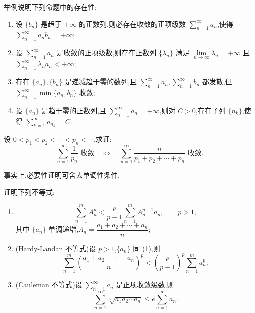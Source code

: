 \documentclass[../../数学分析培优讲义.tex]{subfiles}
\begin{document}
\begin{example}[\markstar]
举例说明下列命题中的存在性:
\begin{enumerate}[label=(\arabic*)]
    \item 设 $\{b_n\}$ 是趋于 $+\infty$ 的正数列,则必存在收敛的正项级数 $\displaystyle\sum\limits_{n=1}^{\infty}a_n$,使得 $\displaystyle\sum\limits_{n=1}^{\infty}a_nb_n=+\infty$;
    \item 设 $\displaystyle\sum\limits_{n=1}^{\infty}a_n$ 是收敛的正项级数,则存在正数列 $\{\lambda_n\}$ 满足 $\displaystyle\lim\limits_{n\to\infty}\lambda_n=+\infty$ 且 $\displaystyle\sum\limits_{n=1}^{\infty}\lambda_na_n<+\infty$;
    \item 存在 $\{a_n\},\{b_n\}$ 是递减趋于零的数列,且 $\displaystyle\sum\limits_{n=1}^{\infty}a_n,\sum\limits_{n=1}^{\infty}b_n$ 都发散,但 $\displaystyle\sum\limits_{n=1}^{\infty}\min\{a_n,b_n\}$ 收敛;
    \item 设 $\{a_n\}$ 是趋于零的正数列,且 $\displaystyle\sum\limits_{n=1}^{\infty}a_n=+\infty$,则对 $C>0$,存在子列 $\{n_k\}$,使得 $\displaystyle\sum\limits_{k=1}^{\infty}a_{n_k}=C$.
\end{enumerate}
\end{example}
\exampleblank

\begin{example}
设 $0<p_1<p_2<\cdots<p_n<\cdots$,求证:
\[
    \sum\limits_{n=1}^{\infty}\dfrac{1}{p_n}\text{ 收敛}
    \quad\Longleftrightarrow\quad
    \sum\limits_{n=1}^{\infty}\dfrac{n}{p_1+p_2+\cdots+p_n}\text{ 收敛}.
\]
\end{example}
\exampleblank

\begin{remark}
事实上,必要性证明可舍去单调性条件.
\end{remark}

\begin{example}
证明下列不等式:
\begin{enumerate}[label=(\arabic*)]
    \item
    \[
        \sum\limits_{n=1}^m A_n^p
        <\dfrac{p}{p-1}\sum\limits_{n=1}^mA_n^{p-1}a_n,
        \qquad p>1,
    \]
    其中 $\{a_n\}$ 单调递增,$\displaystyle A_n=\dfrac{a_1+a_2+\cdots+a_n}{n}$;
    \item (Hardy-Landan 不等式)设 $p>1$,$\{a_n\}$ 同 (1),则
    \[
        \sum\limits_{n=1}^m\left(\dfrac{a_1+a_2+\cdots+a_n}{n}\right)^p
        <\left(\dfrac{p}{p-1}\right)^p\sum\limits_{n=1}^ma_n^p;
    \]
    \item (Cauleman 不等式)设 $\displaystyle\sum\limits_{n=1}^{\infty}a_n$ 是正项收敛级数,则
    \[
        \sum\limits_{n=1}^{\infty}\sqrt[n]{a_1a_2\cdots a_n}
        \leq e\sum\limits_{n=1}^{\infty}a_n.
    \]
\end{enumerate}
\end{example}
\exampleblank
\end{document}
